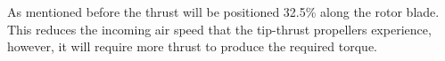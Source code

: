             As mentioned before the thrust will be positioned 32.5\% along the rotor blade. This reduces the incoming air speed that the tip-thrust propellers experience, however, it will require more thrust to produce the required torque.     %




